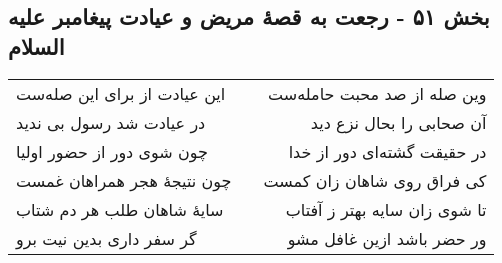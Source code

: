 \begin{center}
\section*{بخش ۵۱ - رجعت به قصهٔ مریض و عیادت پیغامبر علیه السلام}
\label{sec:sh051}
\begin{longtable}{l p{0.5cm} r}
این عیادت از برای این صله‌ست
&&
وین صله از صد محبت حامله‌ست
\\
در عیادت شد رسول بی ندید
&&
آن صحابی را بحال نزع دید
\\
چون شوی دور از حضور اولیا
&&
در حقیقت گشته‌ای دور از خدا
\\
چون نتیجهٔ هجر همراهان غمست
&&
کی فراق روی شاهان زان کمست
\\
سایهٔ شاهان طلب هر دم شتاب
&&
تا شوی زان سایه بهتر ز آفتاب
\\
گر سفر داری بدین نیت برو
&&
ور حضر باشد ازین غافل مشو
\\
\end{longtable}
\end{center}
